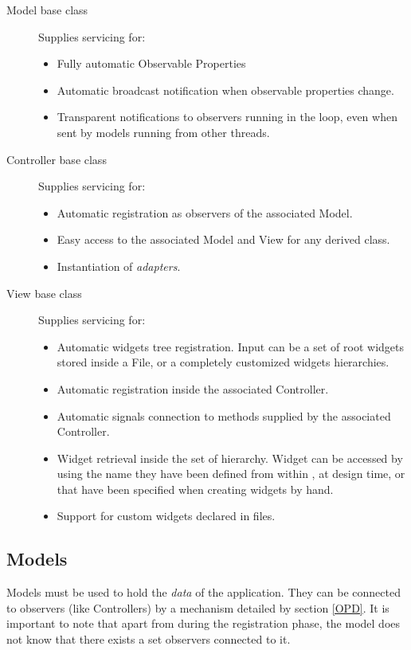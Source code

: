 \begin{description}

\item[Model base class] Supplies servicing for:
 \begin{itemize} 
 \item Fully automatic Observable Properties 
 \item Automatic broadcast notification when observable properties
 change.
 \item Transparent notifications to observers running in the \pygtk
   loop, even when sent by models running from other threads.
 \end{itemize}

\item[Controller base class] Supplies servicing for:
 \begin{itemize} 
 \item Automatic registration as observers of the associated Model.
 \item Easy access to the associated Model and View for any derived
   class.
 \item Instantiation of \emph{adapters}.
 \end{itemize}

\item[View base class] Supplies servicing for:
 \begin{itemize} 
 \item Automatic widgets tree registration. Input can be a set of root
 widgets stored inside a \glade File, or a completely customized widgets
 hierarchies.
 \item Automatic registration inside the associated Controller.
 \item Automatic signals connection to methods supplied by the
 associated Controller.
\item Widget retrieval inside the set of hierarchy. Widget can be
  accessed by using the name they have been defined from within
  \glade, at design time, or that have been specified when creating
  widgets by hand.
\item Support for custom widgets declared in \glade files.
 \end{itemize}

\end{description}


\subsection{\label{MODELS} Models}
Models must be used to hold the \emph{data} of the application. They
can be connected to observers (like Controllers) by a mechanism
detailed by section \ref{OPD}.  It is important to note that apart
from during the registration phase, the model does not know that
there exists a set observers connected to it.

